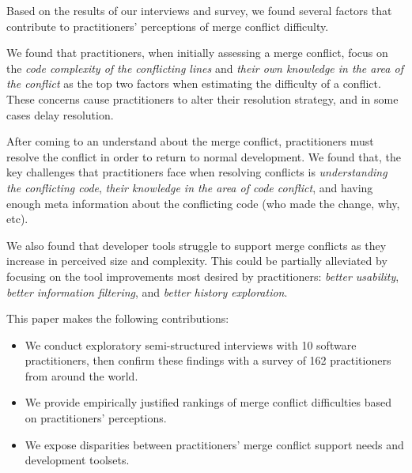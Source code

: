 Based on the results of our interviews and survey, we found several factors that contribute to practitioners' perceptions of merge conflict difficulty.

We found that practitioners, when initially assessing a merge conflict, focus on the \textit{code complexity of the conflicting lines} and \textit{their own knowledge in the area of the conflict} as the top two factors when estimating the difficulty of a conflict. These concerns cause practitioners to alter their resolution strategy, and in some cases delay resolution.

After coming to an understand about the merge conflict, practitioners must resolve the conflict in order to return to normal development.
We found that, the key challenges that practitioners face when resolving conflicts is \textit{understanding the conflicting code}, \textit{their knowledge in the area of code conflict}, and having enough meta information about the conflicting code (who made the change, why, etc).

We also found that developer tools struggle to support merge conflicts as they increase in perceived size and complexity.
This could be partially alleviated by focusing on the tool improvements most desired by practitioners: \textit{better usability}, \textit{better information filtering}, and \textit{better history exploration}.

This paper makes the following contributions:
\begin{itemize}
\item We conduct exploratory semi-structured interviews with 10 software practitioners, then confirm these findings with a survey of 162 practitioners from around the world.
\item We provide empirically justified rankings of merge conflict difficulties based on practitioners' perceptions.
\item We expose disparities between practitioners' merge conflict support needs and development toolsets.
\end{itemize}